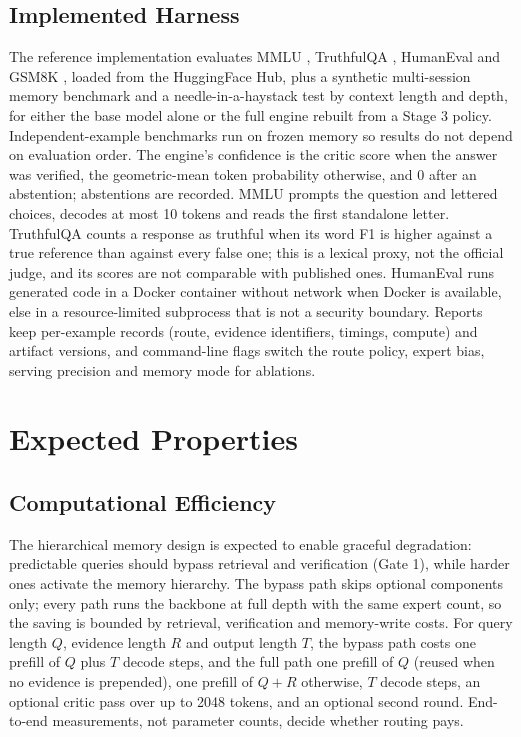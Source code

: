 \documentclass{article}
\begin{document}
\subsection{Implemented Harness}

The reference implementation evaluates MMLU \cite{hendrycks2021mmlu}, TruthfulQA \cite{lin2022truthfulqa}, HumanEval \cite{chen2021codex} and GSM8K \cite{cobbe2021gsm8k}, loaded from the HuggingFace Hub, plus a synthetic multi-session memory benchmark and a needle-in-a-haystack test by context length and depth, for either the base model alone or the full engine rebuilt from a Stage 3 policy. Independent-example benchmarks run on frozen memory so results do not depend on evaluation order. The engine's confidence is the critic score when the answer was verified, the geometric-mean token probability otherwise, and 0 after an abstention; abstentions are recorded. MMLU prompts the question and lettered choices, decodes at most 10 tokens and reads the first standalone letter. TruthfulQA counts a response as truthful when its word F1 is higher against a true reference than against every false one; this is a lexical proxy, not the official judge, and its scores are not comparable with published ones. HumanEval runs generated code in a Docker container without network when Docker is available, else in a resource-limited subprocess that is not a security boundary. Reports keep per-example records (route, evidence identifiers, timings, compute) and artifact versions, and command-line flags switch the route policy, expert bias, serving precision and memory mode for ablations.

\section{Expected Properties}

\subsection{Computational Efficiency}

The hierarchical memory design is expected to enable graceful degradation: predictable queries should bypass retrieval and verification (Gate 1), while harder ones activate the memory hierarchy. The bypass path skips optional components only; every path runs the backbone at full depth with the same expert count, so the saving is bounded by retrieval, verification and memory-write costs. For query length $Q$, evidence length $R$ and output length $T$, the bypass path costs one prefill of $Q$ plus $T$ decode steps, and the full path one prefill of $Q$ (reused when no evidence is prepended), one prefill of $Q + R$ otherwise, $T$ decode steps, an optional critic pass over up to 2048 tokens, and an optional second round. End-to-end measurements, not parameter counts, decide whether routing pays.
\end{document}
